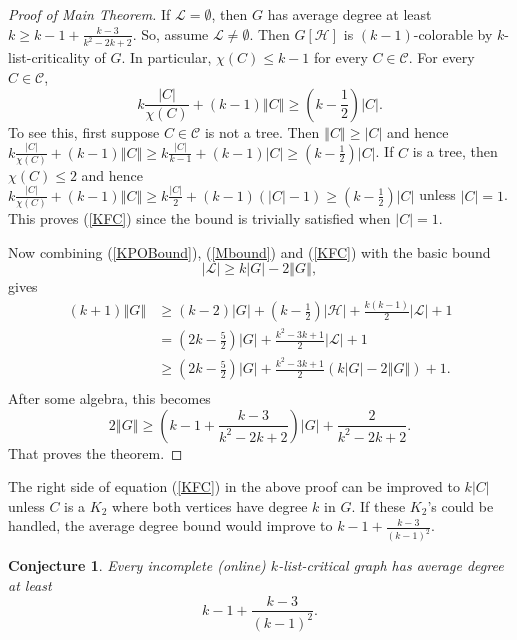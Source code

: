\documentclass[12pt]{article}
\theoremstyle{plain}
\newtheorem*{TheConjecture}{Conjecture}
\theoremstyle{definition}
\theoremstyle{remark}
\newcommand{\fancy}[1]{\mathcal{#1}}
\newcommand{\C}[1]{\fancy{C}_{#1}}
\renewcommand{\L}{\fancy{L}}
\newcommand{\HH}{\fancy{H}}
\newcommand{\card}[1]{\left|#1\right|}
\newcommand{\size}[1]{\left\Vert#1\right\Vert}
\newcommand{\parens}[1]{\left( #1 \right)}
\def\C{\fancy{C}}
\begin{document}
\begin{proof}[Proof of Main Theorem]
	If $\L = \emptyset$, then $G$ has average degree at least $k \ge k-1 + \frac{k-3}{k^2-2k+2}$.  So, assume $\L \ne \emptyset$.  Then $G[\HH]$ is $(k-1)$-colorable by $k$-list-criticality of $G$. In particular, $\chi(C) \le k-1$ for every $C \in \C$.
	For every $C \in \C$,
	\begin{equation}
	 k\frac{\card{C}}{\chi(C)} + (k-1)\size{C} \ge \parens{k - \frac12}\card{C}.
	 \label{KFC}
	\end{equation}
	To see this, first suppose $C \in \C$ is not a tree. Then $\size{C} \ge \card{C}$ and hence $k\frac{\card{C}}{\chi(C)} + (k-1)\size{C} \ge k\frac{\card{C}}{k-1} + (k-1)\card{C} \ge (k - \frac12)\card{C}$.  If $C$ is a tree, then $\chi(C) \le 2$ and hence 
	$k\frac{\card{C}}{\chi(C)} + (k-1)\size{C} \ge k\frac{\card{C}}{2} + (k-1)(\card{C} - 1) \ge (k-\frac12)\card{C}$ unless $\card{C} = 1$.  This proves (\ref{KFC}) since the bound is trivially satisfied when $\card{C} = 1$.
	
	Now combining (\ref{KPOBound}), (\ref{Mbound}) and (\ref{KFC}) with the basic bound
	\begin{equation*}
	  \card{\L} \ge k\card{G} - 2\size{G},
	\end{equation*}	
	gives
	\begin{align*}
	(k+1)\size{G} &\ge (k-2)\card{G} + \parens{k - \frac12}\card{\HH} + \frac{k(k-1)}{2}\card{\L} + 1\\
	&= \parens{2k-\frac52}\card{G} + \frac{k^2 - 3k + 1}{2}\card{\L} + 1\\
	&\ge\parens{2k-\frac52}\card{G} + \frac{k^2 - 3k + 1}{2}\parens{k\card{G} - 2\size{G}} + 1.\\
	\end{align*}
	After some algebra, this becomes
	\begin{equation*}
		2\size{G} \ge \parens{k-1 + \frac{k-3}{k^2 -2k + 2}}\card{G} + \frac{2}{k^2 -2k + 2}.
	\end{equation*}
	That proves the theorem.
\end{proof}

The right side of equation (\ref{KFC}) in the above proof can be improved to $k\card{C}$ unless $C$ is a $K_2$ where both vertices have degree $k$ in $G$.  
If these $K_2$'s could be handled, the average degree bound would improve to $k-1 + \frac{k-3}{(k-1)^2}$.  

\begin{TheConjecture}
Every incomplete (online) $k$-list-critical graph has average degree at least \[k-1 + \frac{k-3}{(k-1)^2}.\]
\end{TheConjecture}



\end{document}
